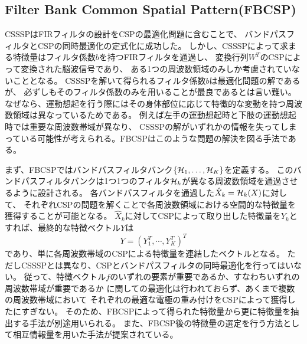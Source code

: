 \subsection{\rm Filter Bank Common Spatial Pattern(FBCSP)}
CSSSPはFIRフィルタの設計をCSPの最適化問題に含むことで、
バンドパスフィルタとCSPの同時最適化の定式化に成功した。
しかし、CSSSPによって求まる特徴量はフィルタ係数\(b\)を持つFIRフィルタを通過し、
変換行列\(W^T\)のCSPによって変換された脳波信号であり、
ある1つの周波数領域のみしか考慮されていないこととなる。
CSSSPを解いて得られるフィルタ係数\(b\)は最適化問題の解であるが、
必ずしもそのフィルタ係数のみを用いることが最良であるとは言い難い。
なぜなら、運動想起を行う際にはその身体部位に応じて特徴的な変動を持つ周波数領域は異なっているためである。
例えば左手の運動想起時と下肢の運動想起時では重要な周波数帯域が異なり、
CSSSPの解がいずれかの情報を失ってしまっている可能性が考えられる。FBCSPはこのような問題の解決を図る手法である\cite{fbcsp}。

まず、FBCSPではバンドパスフィルタバンク\(\{ {\cal H}_1, \ldots, {\cal H}_K \}\)を定義する。
このバンドパスフィルタバンクは1つ1つのフィルタ\({\cal H}_k\)が異なる周波数領域を通過させるように設計される。
各バンドパスフィルタを通過した\(\hat X_k = {\cal H}_k(X)\)に対して、
それぞれCSPの問題を解くことで各周波数領域における空間的な特徴量を獲得することが可能となる。
\({\hat X}_k\)に対してCSPによって取り出した特徴量を\(Y_k\)とすれば、最終的な特徴ベクトル\(Y\)は
\begin{equation}
    Y = (Y_1^T,\cdots, Y_K^T)^T
\end{equation}
であり、単に各周波数帯域のCSPによる特徴量を連結したベクトルとなる。
ただしCSSSPとは異なり、CSPとバンドパスフィルタの同時最適化を行ってはいない。
従って、特徴ベクトル\(f\)のいずれの要素が重要であるか、すなわちいずれの周波数帯域が重要であるか
に関しての最適化は行われておらず、あくまで複数の周波数帯域において
それぞれの最適な電極の重み付けをCSPによって獲得したにすぎない。
そのため、FBCSPによって得られた特徴量から更に特徴量を抽出する手法が別途用いられる。
また、FBCSP後の特徴量の選定を行う方法として相互情報量を用いた手法が提案されている\cite{fbcspBCICOMPE}。

